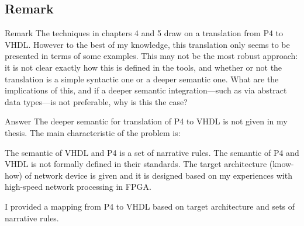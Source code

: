 \subsection{Remark \theRemarkCounter}
\begin{frame}[allowframebreaks]
    \begin{block}{Remark \theRemarkCounter}
       The techniques in chapters 4 and 5 draw on a translation from P4 to VHDL. However to the
       best of my knowledge, this translation only seems to be presented in terms of some examples.
       This may not be the most robust approach: it is not clear exactly how this is defined in the
       tools, and whether or not the translation is a simple syntactic one or a deeper semantic one.
       What are the implications of this, and if a deeper semantic integration---such as via abstract
       data types---is not preferable, why is this the case?     
    \end{block}
    
    \begin{exampleblock}{Answer}
        The deeper semantic for translation of P4 to VHDL is not given in my thesis. The main characteristic of the problem is:
        \begin{itemize}
            \fitem The semantic of VHDL and P4 is a set of narrative rules.
            \fitem The semantic of P4 and VHDL is not formally defined in their standards.
            \fitem The target architecture (know-how) of network device is given and it is designed based on my experiences with high-speed network processing in FPGA.
        \end{itemize}
        
        I provided a mapping from P4 to VHDL based on target architecture and sets of narrative rules.
    \end{exampleblock}
    

\end{frame}
